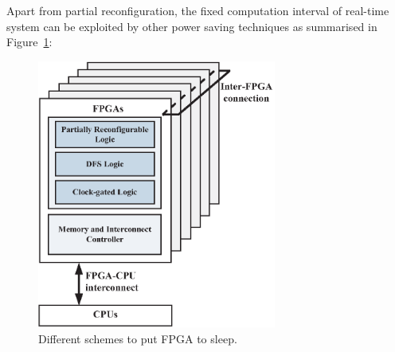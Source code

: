 Apart from partial reconfiguration, the fixed computation interval of real-time system can be exploited by other power saving techniques as summarised in Figure~\ref{fig:partial_scheme}:

\begin{figure}[t!]
\centering
\includegraphics[width=0.7\textwidth]{6_conclusion/figures/partial_scheme}
\caption{Different schemes to put FPGA to sleep.}
\label{fig:partial_scheme}
\end{figure}

